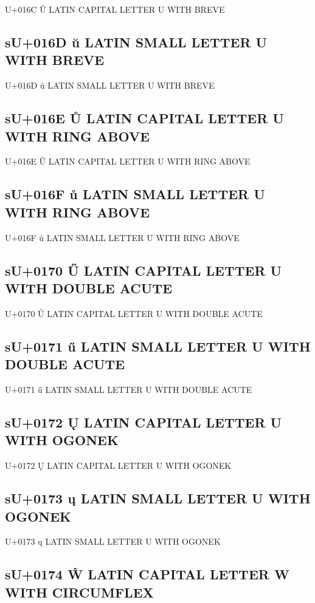U+016C Ŭ  LATIN CAPITAL LETTER U WITH BREVE

\subsection{sU+016D ŭ  LATIN SMALL LETTER U WITH BREVE}

U+016D ŭ  LATIN SMALL LETTER U WITH BREVE

\subsection{sU+016E Ů  LATIN CAPITAL LETTER U WITH RING ABOVE}

U+016E Ů  LATIN CAPITAL LETTER U WITH RING ABOVE

\subsection{sU+016F ů  LATIN SMALL LETTER U WITH RING ABOVE}

U+016F ů  LATIN SMALL LETTER U WITH RING ABOVE

\subsection{sU+0170 Ű  LATIN CAPITAL LETTER U WITH DOUBLE ACUTE}

U+0170 Ű  LATIN CAPITAL LETTER U WITH DOUBLE ACUTE

\subsection{sU+0171 ű  LATIN SMALL LETTER U WITH DOUBLE ACUTE}

U+0171 ű  LATIN SMALL LETTER U WITH DOUBLE ACUTE

\subsection{sU+0172 Ų  LATIN CAPITAL LETTER U WITH OGONEK}

U+0172 Ų  LATIN CAPITAL LETTER U WITH OGONEK

\subsection{sU+0173 ų  LATIN SMALL LETTER U WITH OGONEK}

U+0173 ų  LATIN SMALL LETTER U WITH OGONEK

\subsection{sU+0174 Ŵ  LATIN CAPITAL LETTER W WITH CIRCUMFLEX}

